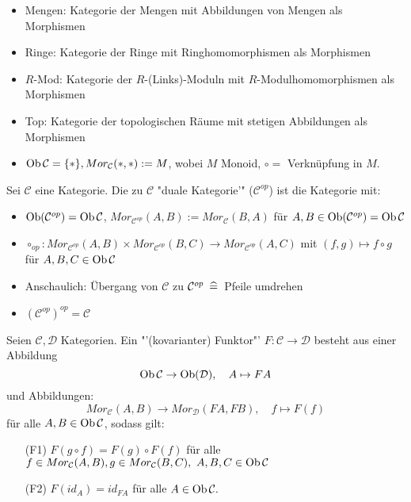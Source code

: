 \begin{bsp}
	\begin{itemize}
		\item Mengen: Kategorie der Mengen mit Abbildungen von Mengen als Morphismen
		\item Ringe: Kategorie der Ringe mit Ringhomomorphismen als Morphismen
		\item $R$-Mod: Kategorie der $R$-(Links)-Moduln mit $R$-Modulhomomorphismen als Morphismen
		\item Top: Kategorie der topologischen Räume mit stetigen Abbildungen als Morphismen
		\item $\text{Ob}\,\mathcal{C}=\{\ast\}, Mor_{\mathcal{C}}(\ast,\ast) := M $, wobei $M$ Monoid, $\circ = $ Verknüpfung in $M$.
	\end{itemize}
\end{bsp}
\begin{df}
	Sei $\mathcal{C}$  eine Kategorie. Die zu $\mathcal{C}$ "duale Kategorie'" ($\mathcal{C}^{op}$) ist die Kategorie mit: 
	\begin{itemize}
		\item $\text{Ob}(\mathcal{C}^{op}) = \text{Ob}\,\mathcal{C}$, $Mor_{\mathcal{C}^{op}}(A,B) := Mor_{\mathcal{C}}(B,A)$ für $A,B \in \text{Ob}(\mathcal{C}^{op}) = \text{Ob}\,\mathcal{C}$
		\item $\circ_{op}: Mor_{\mathcal{C}^{op}}(A,B) \times Mor_{\mathcal{C}^{op}}(B,C) \to Mor_{\mathcal{C}^{op}}(A,C) $ mit $(f,g) \mapsto f \circ g $ für $A,B,C \in \text{Ob}\,\mathcal{C}$
	\end{itemize}
\end{df}
\begin{anm}
	\begin{itemize}
		\item  Anschaulich: Übergang von $\mathcal{C}$ zu  $\mathcal{C}^{op} \ \, \widehat{=} \, $ Pfeile umdrehen
		\item $(\mathcal{C}^{op})^{op} = \mathcal{C}$
	\end{itemize}
\end{anm}
\begin{df}
	Seien $\mathcal{C}, \mathcal{D} $ Kategorien. Ein "'(kovarianter) Funktor"' $F: \mathcal{C} \to \mathcal{D} $ besteht aus einer Abbildung $$ \text{Ob}\,\mathcal{C} \to \text{Ob}(\mathcal{D}), \quad A \mapsto FA$$
	und Abbildungen: $$ Mor_{\mathcal{C}}(A,B) \to Mor_{\mathcal{D}}(FA,FB), \quad f \mapsto F(f) $$ für alle $A,B \in \text{Ob}\,\mathcal{C}$, sodass gilt:
	\begin{enumerate}
		\item[(F1)] $F(g \circ f) = F(g) \circ F(f) $ für alle $ f \in Mor_{\mathcal{C}}(A,B), g\in Mor_{\mathcal{C}}(B,C), \ A,B,C \in \text{Ob}\,\mathcal{C}$
		\item[(F2)] $F(id_A) =id_{FA} $ für alle $A \in \text{Ob}\,\mathcal{C}.$
	\end{enumerate}
\end{df}
